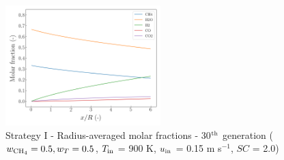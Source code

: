 \documentclass[preprint,12pt]{elsarticle}
\begin{document}
\begin{figure}[h!]
\centering
\includegraphics[width=60mm]{results/5/50C_50T/GEN30-AVG.png}
\caption{\label{fig:5R5050G30-avg} Strategy I - Radius-averaged molar fractions -  30$^{\rm{th}}$ generation ($w_{\rm{CH_4}} = 0.5, w_T = 0.5$, $T_{\rm{in}}$ = 900 K, $u_{\rm{in}}$ = 0.15 m s$^{-1}$, $SC$ = 2.0)}
\end{figure}
\end{document}
